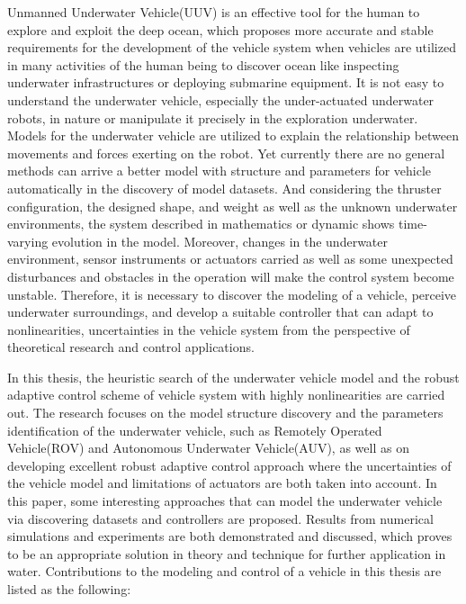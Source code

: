 \begin{englishabstract}
Unmanned Underwater Vehicle(UUV) is an effective tool for the human to explore and exploit the deep ocean, which proposes more accurate and stable requirements for the development of the vehicle system when vehicles are utilized in many activities of the human being to discover ocean like inspecting underwater infrastructures or deploying submarine equipment. It is not easy to understand the underwater vehicle, especially the under-actuated underwater robots, in nature or manipulate it precisely in the exploration underwater. Models for the underwater vehicle are utilized to explain the relationship between movements and forces exerting on the robot. Yet currently there are no general methods can arrive a better model with structure and parameters for vehicle automatically in the discovery of model datasets. And considering the thruster configuration, the designed shape, and weight as well as the unknown underwater environments, the system described in mathematics or dynamic shows time-varying evolution in the model. Moreover, changes in the underwater environment, sensor instruments or actuators carried as well as some unexpected disturbances and obstacles in the operation will make the control system become unstable. Therefore, it is necessary to discover the modeling of a vehicle, perceive underwater surroundings, and develop a suitable controller that can adapt to nonlinearities, uncertainties in the vehicle system from the perspective of theoretical research and control applications.

In this thesis, the heuristic search of the underwater vehicle model and the robust adaptive control scheme of vehicle system with highly nonlinearities are carried out.  The research focuses on the model structure discovery and the parameters identification of the underwater vehicle, such as Remotely Operated Vehicle(ROV) and Autonomous Underwater Vehicle(AUV), as well as on developing excellent robust adaptive control approach where the uncertainties of the vehicle model and limitations of actuators are both taken into account. In this paper, some interesting approaches that can model the underwater vehicle via discovering datasets and controllers are proposed. Results from numerical simulations and experiments are both demonstrated and discussed, which proves to be an appropriate solution in theory and technique for further application in water. Contributions to the modeling and control of a vehicle in this thesis are listed as the following:



\end{englishabstract}
